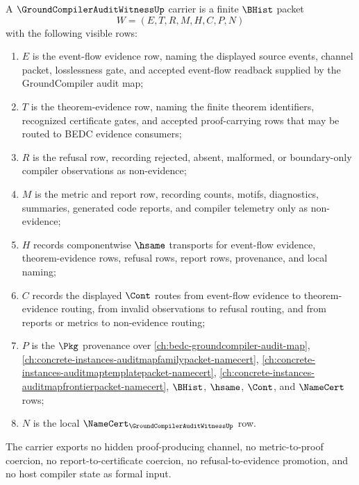 \begin{definition}
\label{def:groundcompiler-audit-witness-carrier}
A $\GroundCompilerAuditWitnessUp$ carrier is a finite $\BHist$ packet
$$
W=(E,T,R,M,H,C,P,N)
$$
with the following visible rows:
\begin{enumerate}
\item $E$ is the event-flow evidence row, naming the displayed source events, channel packet, losslessness gate, and accepted event-flow readback supplied by the GroundCompiler audit map;
\item $T$ is the theorem-evidence row, naming the finite theorem identifiers, recognized certificate gates, and accepted proof-carrying rows that may be routed to BEDC evidence consumers;
\item $R$ is the refusal row, recording rejected, absent, malformed, or boundary-only compiler observations as non-evidence;
\item $M$ is the metric and report row, recording counts, motifs, diagnostics, summaries, generated code reports, and compiler telemetry only as non-evidence;
\item $H$ records componentwise $\hsame$ transports for event-flow evidence, theorem-evidence rows, refusal rows, report rows, provenance, and local naming;
\item $C$ records the displayed $\Cont$ routes from event-flow evidence to theorem-evidence routing, from invalid observations to refusal routing, and from reports or metrics to non-evidence routing;
\item $P$ is the $\Pkg$ provenance over \autoref{ch:bedc-groundcompiler-audit-map}, \autoref{ch:concrete-instances-auditmapfamilypacket-namecert}, \autoref{ch:concrete-instances-auditmaptemplatepacket-namecert}, \autoref{ch:concrete-instances-auditmapfrontierpacket-namecert}, $\BHist$, $\hsame$, $\Cont$, and $\NameCert$ rows;
\item $N$ is the local $\NameCert_{\GroundCompilerAuditWitnessUp}$ row.
\end{enumerate}
The carrier exports no hidden proof-producing channel, no metric-to-proof coercion, no report-to-certificate coercion, no refusal-to-evidence promotion, and no host compiler state as formal input.
\end{definition}

